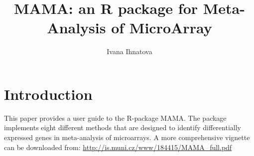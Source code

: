 \documentclass[a4paper]{report}
\title{MAMA: an R package for Meta-Analysis of MicroArray}
\author{Ivana Ihnatova}
\begin{document}
\maketitle
\tableofcontents
\newpage
\chapter{Introduction}



This paper provides a user guide to the R-package MAMA. The package implements eight different methods that are designed to identify differentially expressed genes in meta-analysis of microarrays. A more comprehensive vignette can be downloaded from: \url{http://is.muni.cz/www/184415/MAMA_full.pdf} \par
                                                                              
\end{document}
